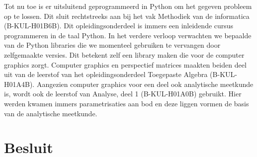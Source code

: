 \documentclass[a4paper,11pt]{article}
\begin{document}
		Tot nu toe is er uitsluitend geprogrammeerd in Python om het gegeven probleem op te lossen. Dit sluit rechtstreeks aan bij het vak Methodiek van de informatica (B-KUL-H01B6B). Dit opleidingsonderdeel is immers een inleidende cursus programmeren in de taal Python. In het verdere verloop verwachten we bepaalde van de Python libraries die we momenteel gebruiken te vervangen door zelfgemaakte versies. Dit betekent zelf een library maken die voor de computer graphics zorgt. Computer graphics en perspectief matrices maakten beiden deel uit van de leerstof van het opleidingsonderdeel Toegepaste Algebra (B-KUL-H01A4B). Aangezien computer graphics voor een deel ook analytische meetkunde is, wordt ook de leerstof van Analyse, deel 1 (B-KUL-H01A0B) gebruikt. Hier werden kwamen immers parametrisaties aan bod en deze liggen vormen de basis van de analytische meetkunde.
		
	\section{Besluit}
	
	
	
	
	
	\begin{thebibliography}{10}	%
		
	\end{thebibliography}
	\listoffigures		%
	\listoftables		%
\end{document}
